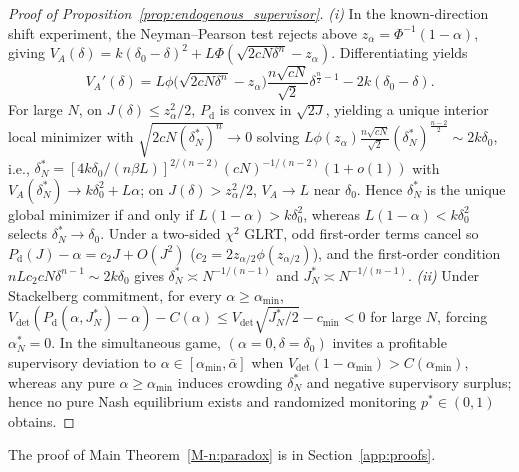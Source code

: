 \documentclass[12pt]{article}
\theoremstyle{definition}
\theoremstyle{remark}
\begin{document}
\begin{proof}[Proof of Proposition~\ref{prop:endogenous_supervisor}]
\emph{(i)} In the known-direction shift experiment, the Neyman--Pearson test rejects above $z_\alpha = \Phi^{-1}(1 - \alpha)$, giving $V_A(\delta) = k(\delta_0 - \delta)^2 + L \Phi(\sqrt{2 c N \delta^n} - z_\alpha)$. Differentiating yields
\[
  V_A'(\delta) = L \phi\bigl(\sqrt{2 c N \delta^n} - z_\alpha\bigr) \frac{n \sqrt{c N}}{\sqrt{2}} \delta^{\frac{n}{2} - 1} - 2 k (\delta_0 - \delta).
\]
For large $N$, on $J(\delta) \le z_\alpha^2/2$, $P_{\mathrm{d}}$ is convex in $\sqrt{2J}$, yielding a unique interior local minimizer with $\sqrt{2 c N (\delta_N^*)^n} \to 0$ solving $L \phi(z_\alpha) \frac{n \sqrt{c N}}{\sqrt{2}} (\delta_N^*)^{\frac{n-2}{2}} \sim 2 k \delta_0$, i.e., $\delta_N^* = [4 k \delta_0 / (n \beta L)]^{2/(n-2)} (c N)^{-1/(n-2)} (1 + o(1))$ with $V_A(\delta_N^*) \to k\delta_0^2 + L \alpha$; on $J(\delta) > z_\alpha^2/2$, $V_A \to L$ near $\delta_0$. Hence $\delta_N^*$ is the unique global minimizer if and only if $L(1 - \alpha) > k \delta_0^2$, whereas $L(1 - \alpha) < k \delta_0^2$ selects $\delta_N^* \to \delta_0$. Under a two-sided $\chi^2$ GLRT, odd first-order terms cancel so $P_{\mathrm{d}}(J) - \alpha = c_2 J + O(J^2)$ ($c_2 = 2 z_{\alpha/2}\phi(z_{\alpha/2})$), and the first-order condition $n L c_2 c N \delta^{n-1} \sim 2 k \delta_0$ gives $\delta_N^* \asymp N^{-1/(n-1)}$ and $J_N^* \asymp N^{-1/(n-1)}$. \emph{(ii)} Under Stackelberg commitment, for every $\alpha \ge \alpha_{\min}$, $V_{\mathrm{det}}(P_{\mathrm{d}}(\alpha, J_N^*) - \alpha) - C(\alpha) \le V_{\mathrm{det}} \sqrt{J_N^*/2} - c_{\min} < 0$ for large $N$, forcing $\alpha_N^* = 0$. In the simultaneous game, $(\alpha=0, \delta=\delta_0)$ invites a profitable supervisory deviation to $\alpha \in [\alpha_{\min}, \bar\alpha]$ when $V_{\mathrm{det}}(1-\alpha_{\min}) > C(\alpha_{\min})$, whereas any pure $\alpha \ge \alpha_{\min}$ induces crowding $\delta_N^*$ and negative supervisory surplus; hence no pure Nash equilibrium exists and randomized monitoring $p^* \in (0, 1)$ obtains.
\end{proof}


The proof of Main Theorem~\ref{M-n:paradox} is in Section~\ref{app:proofs}.
\end{document}
